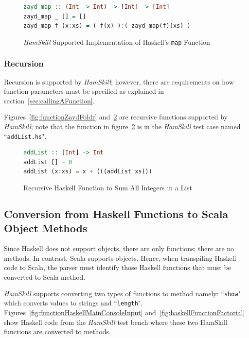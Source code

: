 \documentclass{report}
\begin{document}
\begin{figure}[H]
\begin{mdframed}
\begin{lstlisting}[language=Haskell]
zayd_map :: (Int -> Int) -> [Int] -> [Int]
zayd_map _ [] = []
zayd_map f (x:xs) = ( f(x) ):( zayd_map(f)(xs) )
\end{lstlisting}
\end{mdframed}
\caption{\textit{HamSkill} Supported Implementation of Haskell's \texttt{map} Function}\label{fig:haskellFunctionMap}
\end{figure}

\subsubsection{Recursion}

Recursion is supported by \textit{HamSkill}; however, there are requirements on how function parameters must be specified as explained in section~\ref{sec:callingAFunction}.

Figures~\ref{fig:functionZaydFoldr} and~\ref{fig:functionAddList} are recursive functions supported by \textit{HamSkill}; note that the function in figure~\ref{fig:functionAddList} is in the \textit{HamSkill} test case named ``\texttt{addList.hs}".

\begin{figure}[H]
\begin{mdframed}
\begin{lstlisting}[language=Haskell]
addList :: [Int] -> Int
addList [] = 0
addList (x:xs) = x + (((addList xs)))
\end{lstlisting}
\end{mdframed}
\caption{Recursive Haskell Function to Sum All Integers in a List}\label{fig:functionAddList}
\end{figure}

\subsection{Conversion from Haskell Functions to Scala Object Methods}

Since Haskell does not support objects, there are only functions; there are no methods.  In contrast, Scala supports objects.  Hence, when transpiling Haskell code to Scala, the parser must identify those Haskell functions that must be converted to Scala method.  

\textit{HamSkill} supports converting two types of functions to method namely: ``\texttt{show}" which converts values to strings and ``\texttt{length}".  Figures~\ref{fig:functionHaskellMainConsoleInput} and~\ref{fig:haskellFunctionFactorial} show Haskell code from the \textit{HamSkill} test bench where these two HamSkill functions are converted to methods.
\end{document}
